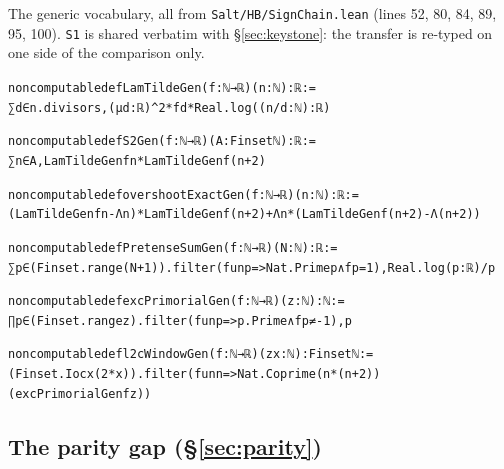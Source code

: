 \documentclass{CUP-JNL-FMP}
\newcommand{\leaninline}[1]{{\small\texttt{#1}}}
\theoremstyle{remark}
\begin{document}
\noindent The generic vocabulary, all from \leaninline{Salt/HB/SignChain.lean}
(lines 52, 80, 84, 89, 95, 100). \leaninline{S1} is shared verbatim with
\S\ref{sec:keystone}: the transfer is re-typed on one side of the comparison
only.
{\footnotesize\begin{alltt}
noncomputable def LamTildeGen (f : ℕ → ℝ) (n : ℕ) : ℝ :=
  ∑ d ∈ n.divisors, (μ d : ℝ) ^ 2 * f d * Real.log ((n / d : ℕ) : ℝ)

noncomputable def S2Gen (f : ℕ → ℝ) (A : Finset ℕ) : ℝ :=
  ∑ n ∈ A, LamTildeGen f n * LamTildeGen f (n + 2)

noncomputable def overshootExactGen (f : ℕ → ℝ) (n : ℕ) : ℝ :=
  (LamTildeGen f n - Λ n) * LamTildeGen f (n + 2) + Λ n * (LamTildeGen f (n + 2) - Λ (n + 2))

noncomputable def PretenseSumGen (f : ℕ → ℝ) (N : ℕ) : ℝ :=
  ∑ p ∈ (Finset.range (N + 1)).filter (fun p => Nat.Prime p ∧ f p = 1), Real.log (p : ℝ) / p

noncomputable def excPrimorialGen (f : ℕ → ℝ) (z : ℕ) : ℕ :=
  ∏ p ∈ (Finset.range z).filter (fun p => p.Prime ∧ f p ≠ -1), p

noncomputable def l2cWindowGen (f : ℕ → ℝ) (z x : ℕ) : Finset ℕ :=
  (Finset.Ioc x (2 * x)).filter (fun n => Nat.Coprime (n * (n + 2)) (excPrimorialGen f z))
\end{alltt}}

\subsection{The parity gap (\S\ref{sec:parity})}
\end{document}

